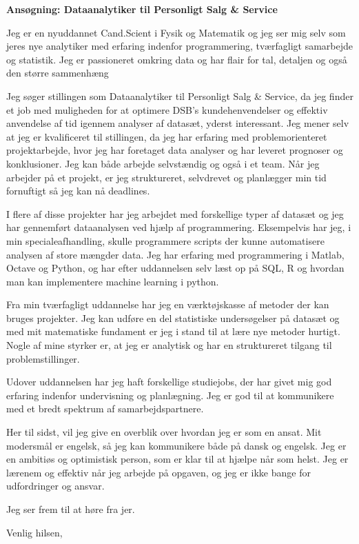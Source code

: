 \documentclass[12pt,a4paper]{letter}
\begin{document}
\begin{letter}{}
\opening{\textbf{Ansøgning: Dataanalytiker til Personligt Salg \& Service}} 

Jeg er en nyuddannet Cand.Scient i Fysik og Matematik og jeg ser mig selv som jeres nye analytiker med erfaring indenfor programmering, tværfagligt samarbejde og statistik. Jeg er passioneret omkring data og har flair for tal, detaljen og også den større sammenhæng 

Jeg søger stillingen som Dataanalytiker til Personligt Salg \& Service, da jeg finder et job med muligheden for at optimere DSB's kundehenvendelser og effektiv anvendelse af tid igennem analyser af datasæt, yderst interessant. Jeg mener selv at jeg er kvalificeret til stillingen, da jeg har erfaring med problemorienteret projektarbejde, hvor jeg har foretaget data analyser og har leveret prognoser og konklusioner. Jeg kan både arbejde selvstændig og også i et team. Når jeg arbejder på et projekt, er jeg struktureret, selvdrevet og planlægger min tid fornuftigt så jeg kan nå deadlines.      

I flere af disse projekter har jeg arbejdet med forskellige typer af datasæt og jeg har gennemført dataanalysen ved hjælp af programmering. Eksempelvis har jeg, i min specialeafhandling, skulle programmere scripts der kunne automatisere analysen af store mængder data. Jeg har erfaring med programmering i Matlab, Octave og Python, og har efter uddannelsen selv læst op på SQL, R og hvordan man kan implementere machine learning i python. 

Fra min tværfagligt uddannelse har jeg en værktøjskasse af metoder der kan bruges projekter. Jeg kan udføre en del statistiske undersøgelser på datasæt og med mit matematiske fundament er jeg i stand til at lære nye metoder hurtigt. Nogle af mine styrker er, at jeg er analytisk og har en struktureret tilgang til problemstillinger. 
 
Udover uddannelsen har jeg haft forskellige studiejobs, der har givet mig god erfaring indenfor undervisning og planlægning. Jeg er god til at kommunikere med et bredt spektrum af samarbejdspartnere.

Her til sidst, vil jeg give en overblik over hvordan jeg er som en ansat. Mit modersmål er engelsk, så jeg kan kommunikere både på dansk og engelsk. Jeg er en ambitiøs og optimistisk person, som er klar til at hjælpe når som helst. Jeg er lærenem og effektiv når jeg arbejde på opgaven, og jeg er ikke bange for udfordringer og ansvar. 

Jeg ser frem til at høre fra jer.
\closing{Venlig hilsen,}

\end{letter}
\end{document}
